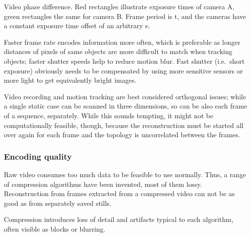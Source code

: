 {Video phase difference.
Red rectangles illustrate exposure times of camera A, green rectangles the same for camera B.
Frame period is t, and the cameras have a constant exposure time offset of an arbitrary e.}

Faster frame rate encodes information more often, which is preferable as longer distances of pixels of same objects are more difficult to match when tracking objects; faster shutter speeds help to reduce motion blur.
Fast shutter (i.e.~short exposure) obviously needs to be compensated by using more sensitive sensors or more light to get equivalently bright images.

Video recording and motion tracking are best considered orthogonal issues; while a single static case can be scanned in three dimensions, so can be also each frame of a sequence, separately.
While this sounds tempting, it might not be computationally feasible, though, because the reconstruction must be started all over again for each frame and the topology is uncorrelated between the frames.



\subsubsection{Encoding quality} %

Raw video consumes too much data to be feasible to use normally.
Thus, a range of compression algorithms have been invented, most of them lossy.
Reconstruction from frames extracted from a compressed video can not be as good as from separately saved stills.

Compression introduces loss of detail and artifacts typical to each algorithm, often visible as blocks or blurring.

